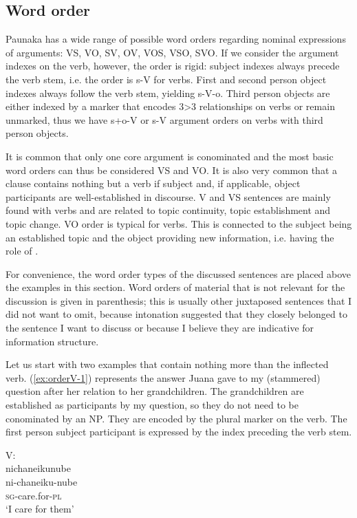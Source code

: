 \subsection{Word order}\label{sec:WordOrder}

Paunaka has a wide range of possible word orders regarding nominal expressions of arguments: VS, VO, SV, OV, VOS, VSO, SVO. If we consider the argument indexes on the verb, however, the order is rigid: subject indexes always precede the verb stem, i.e. the order is s-V for  verbs. First and second person object indexes always follow the verb stem, yielding s-V-o. Third person objects are either indexed by a marker that encodes 3>3 relationships on verbs or remain unmarked, thus we have s+o-V or s-V argument orders on verbs with third person objects.

It is common that only one core argument is conominated and the most basic word orders can thus be considered VS and VO. It is also very common that a clause contains nothing but a verb if subject and, if applicable, object participants are well-established in discourse. V and VS sentences are mainly found with  verbs and are related to topic continuity, topic establishment and topic change. VO order is typical for  verbs. This is connected to the subject being an established topic and the object providing new information, i.e. having the role of  \citep[cf.][]{Lambrecht1994}.

For convenience, the word order types of the discussed sentences are placed above the examples in this section. Word orders of material that is not relevant for the discussion is given in parenthesis; this is usually other juxtaposed sentences that I did not want to omit, because intonation suggested that they closely belonged to the sentence I want to discuss or because I believe they are indicative for information structure.

Let us start with two examples that contain nothing more than the inflected verb. (\ref{ex:orderV-1}) represents the answer Juana gave to my (stammered) question after her relation to her grandchildren. The grandchildren are established as participants by my question, so they do not need to be conominated by an NP. They are encoded by the plural marker on the verb. The first person subject participant is expressed by the index preceding the verb stem.

\ea\label{ex:orderV-1}
\begingl
\glpreamble \textup{V:}\\nichaneikunube\\
\gla ni-chaneiku-nube\\
\textsc{sg}-care.for-\textsc{pl}\\
\glft ‘I care for them’
\endgl
\trailingcitation{[jxx-p110923l-1.161]}
\xe


